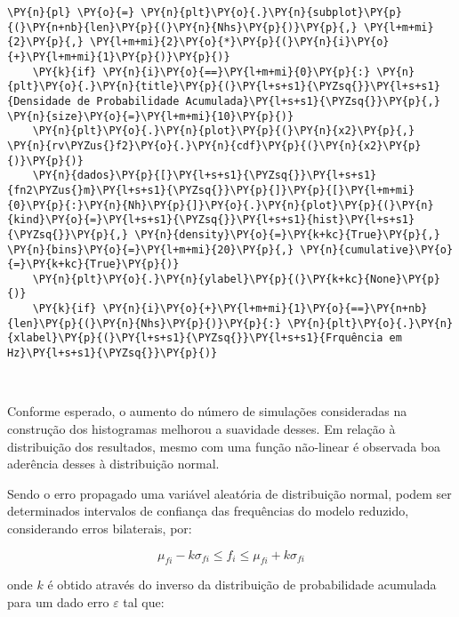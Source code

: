 \begin{tcolorbox}[breakable, size=fbox, boxrule=1pt, pad at break*=1mm,colback=cellbackground, colframe=cellborder]
\begin{Verbatim}[commandchars=\\\{\}]
    \PY{n}{pl} \PY{o}{=} \PY{n}{plt}\PY{o}{.}\PY{n}{subplot}\PY{p}{(}\PY{n+nb}{len}\PY{p}{(}\PY{n}{Nhs}\PY{p}{)}\PY{p}{,} \PY{l+m+mi}{2}\PY{p}{,} \PY{l+m+mi}{2}\PY{o}{*}\PY{p}{(}\PY{n}{i}\PY{o}{+}\PY{l+m+mi}{1}\PY{p}{)}\PY{p}{)}
    \PY{k}{if} \PY{n}{i}\PY{o}{==}\PY{l+m+mi}{0}\PY{p}{:} \PY{n}{plt}\PY{o}{.}\PY{n}{title}\PY{p}{(}\PY{l+s+s1}{\PYZsq{}}\PY{l+s+s1}{Densidade de Probabilidade Acumulada}\PY{l+s+s1}{\PYZsq{}}\PY{p}{,} \PY{n}{size}\PY{o}{=}\PY{l+m+mi}{10}\PY{p}{)}
    \PY{n}{plt}\PY{o}{.}\PY{n}{plot}\PY{p}{(}\PY{n}{x2}\PY{p}{,} \PY{n}{rv\PYZus{}f2}\PY{o}{.}\PY{n}{cdf}\PY{p}{(}\PY{n}{x2}\PY{p}{)}\PY{p}{)}
    \PY{n}{dados}\PY{p}{[}\PY{l+s+s1}{\PYZsq{}}\PY{l+s+s1}{fn2\PYZus{}m}\PY{l+s+s1}{\PYZsq{}}\PY{p}{]}\PY{p}{[}\PY{l+m+mi}{0}\PY{p}{:}\PY{n}{Nh}\PY{p}{]}\PY{o}{.}\PY{n}{plot}\PY{p}{(}\PY{n}{kind}\PY{o}{=}\PY{l+s+s1}{\PYZsq{}}\PY{l+s+s1}{hist}\PY{l+s+s1}{\PYZsq{}}\PY{p}{,} \PY{n}{density}\PY{o}{=}\PY{k+kc}{True}\PY{p}{,} \PY{n}{bins}\PY{o}{=}\PY{l+m+mi}{20}\PY{p}{,} \PY{n}{cumulative}\PY{o}{=}\PY{k+kc}{True}\PY{p}{)}
    \PY{n}{plt}\PY{o}{.}\PY{n}{ylabel}\PY{p}{(}\PY{k+kc}{None}\PY{p}{)}
    \PY{k}{if} \PY{n}{i}\PY{o}{+}\PY{l+m+mi}{1}\PY{o}{==}\PY{n+nb}{len}\PY{p}{(}\PY{n}{Nhs}\PY{p}{)}\PY{p}{:} \PY{n}{plt}\PY{o}{.}\PY{n}{xlabel}\PY{p}{(}\PY{l+s+s1}{\PYZsq{}}\PY{l+s+s1}{Frquência em Hz}\PY{l+s+s1}{\PYZsq{}}\PY{p}{)}
\end{Verbatim}
\end{tcolorbox}

    \begin{center}
    \end{center}
    { \hspace*{\fill} \\}
    
    Conforme esperado, o aumento do número de simulações consideradas na
construção dos histogramas melhorou a suavidade desses. Em relação à
distribuição dos resultados, mesmo com uma função não-linear é observada
boa aderência desses à distribuição normal.

Sendo o erro propagado uma variável aleatória de distribuição normal,
podem ser determinados intervalos de confiança das frequências do modelo
reduzido, considerando erros bilaterais, por:

\begin{equation}
\mu_{fi} - k \sigma_{fi} \le f_i \le \mu_{fi} + k \sigma_{fi}
\end{equation}

onde \(k\) é obtido através do inverso da distribuição de probabilidade
acumulada para um dado erro \(\varepsilon\) tal que:

